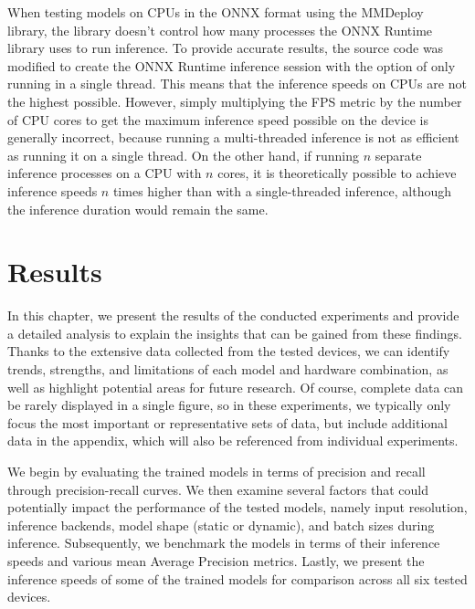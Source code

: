 When testing models on CPUs in the ONNX format using the MMDeploy library, the
library doesn't control how many processes the ONNX Runtime library uses to run
inference. To provide accurate results, the source code was modified to create
the ONNX Runtime inference session with the option of only running in a single
thread. This means that the inference speeds on CPUs are not the highest
possible. However, simply multiplying the FPS metric by the number of CPU cores
to get the maximum inference speed possible on the device is generally
incorrect, because running a multi-threaded inference is not as efficient as
running it on a single thread. On the other hand, if running $n$ separate
inference processes on a CPU with $n$ cores, it is theoretically possible to
achieve inference speeds $n$ times higher than with a single-threaded inference,
although the inference duration would remain the same.











\chapter{Results}
\label{Results}

In this chapter, we present the results of the conducted experiments and provide
a detailed analysis to explain the insights that can be gained from these
findings. Thanks to the extensive data collected from the tested devices, we can
identify trends, strengths, and limitations of each model and hardware
combination, as well as highlight potential areas for future research. Of
course, complete data can be rarely displayed in a single figure, so in these
experiments, we typically only focus the most important or representative sets
of data, but include additional data in the appendix, which will also be
referenced from individual experiments.

We begin by evaluating the trained models in terms of precision and recall
through precision-recall curves. We then examine several factors that could
potentially impact the performance of the tested models, namely input
resolution, inference backends, model shape (static or dynamic), and batch sizes
during inference. Subsequently, we benchmark the models in terms of their
inference speeds and various mean Average Precision metrics. Lastly, we present
the inference speeds of some of the trained models for comparison across all six
tested devices.


